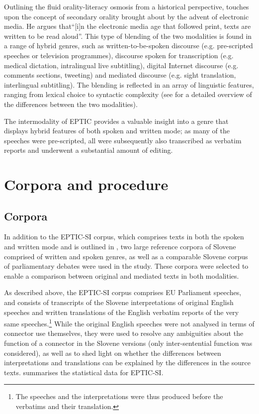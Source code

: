 \documentclass[output=paper]{langscibook}
\begin{document}
Outlining the fluid orality-literacy osmosis from a historical perspective, \citet[930]{Soffer2020} touches upon the concept of secondary orality brought about by the advent of electronic media. He argues that“[i]n the electronic media age that followed print, texts are written to
be read aloud”. This type of blending of the two modalities is found in a range of hybrid genres, such as written-to-be-spoken discourse (e.g. pre-scripted speeches or television programmes), discourse spoken for transcription (e.g. medical dictation, intralingual live subtitling), digital Internet discourse (e.g. comments sections, tweeting) and mediated discourse (e.g. sight translation, interlingual subtitling). The blending is reflected in an array of linguistic features, ranging from lexical choice to syntactic complexity (see \citealt{Wikstroem2017} for a detailed overview of the differences between the two modalities).

The intermodality of EPTIC provides a valuable insight into a genre that displays hybrid features of both spoken and written mode; as many of the speeches were pre-scripted, all were subsequently also transcribed as verbatim reports and underwent a substantial amount of editing. 



\section{
Corpora and procedure
}\label{sec:mikolic:4}

\subsection{
Corpora
}\label{sec:mikolic:4.1}

In addition to the EPTIC-SI corpus, which comprises texts in both the spoken and written mode and is outlined in , two large reference corpora of Slovene comprised of written and spoken genres, as well as a comparable Slovene corpus of parliamentary debates were used in the study. These corpora were selected to enable a comparison between original and mediated texts in both modalities.

\begin{sloppypar}
As described above, the EPTIC-SI corpus comprises EU Parliament speeches, and consists of transcripts of the Slovene interpretations of original English speeches and written translations of the English verbatim reports of the very same speeches.\footnote{The speeches and the interpretations were thus produced before the verbatims and their translation.} While the original English speeches were not analysed in terms of connector use themselves, they were used to resolve any ambiguities about the function of a connector in the Slovene versions (only inter-sentential function was considered), as well as to shed light on whether the differences between interpretations and translations can be explained by the differences in the source texts.  summarises the statistical data for EPTIC-SI.
\end{sloppypar}
\end{document}
